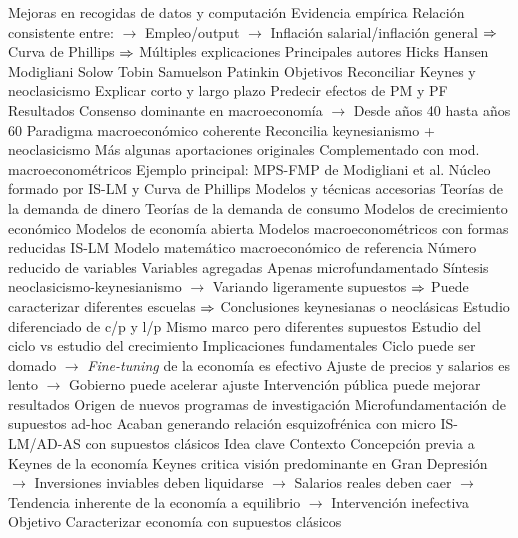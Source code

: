 \documentclass{nuevotema}
\begin{document}
\begin{esquemal}
				\4[] Mejoras en recogidas de datos y computación
				\4 Evidencia empírica
				\4[] Relación consistente entre:
				\4[] $\to$ Empleo/output
				\4[] $\to$ Inflación salarial/inflación general
				\4[] $\Rightarrow$ Curva de Phillips
				\4[] $\Rightarrow$ Múltiples explicaciones
				\4 Principales autores
				\4[] Hicks
				\4[] Hansen
				\4[] Modigliani
				\4[] Solow
				\4[] Tobin
				\4[] Samuelson
				\4[] Patinkin
			\3 Objetivos
				\4 Reconciliar Keynes y neoclasicismo
				\4 Explicar corto y largo plazo
				\4 Predecir efectos de PM y PF
			\3 Resultados
				\4 Consenso dominante en macroeconomía
				\4$\to$  Desde años 40 hasta años 60
				\4 Paradigma macroeconómico coherente
				\4[] Reconcilia keynesianismo + neoclasicismo
				\4[] Más algunas aportaciones originales
				\4[] Complementado con mod. macroeconométricos
				\4[] Ejemplo principal: MPS-FMP de Modigliani et al.
				\4[] Núcleo formado por IS-LM y Curva de Phillips
				\4 Modelos y técnicas accesorias
				\4[] Teorías de la demanda de dinero
				\4[] Teorías de la demanda de consumo
				\4[] Modelos de crecimiento económico
				\4[] Modelos de economía abierta
				\4[] Modelos macroeconométricos con formas reducidas
				\4 IS-LM Modelo matemático macroeconómico de referencia
				\4[] Número reducido de variables
				\4[] Variables agregadas
				\4[] Apenas microfundamentado
				\4[] Síntesis neoclasicismo-keynesianismo
				\4[] $\to$ Variando ligeramente supuestos
				\4[] $\Rightarrow$ Puede caracterizar diferentes escuelas
				\4[] $\Rightarrow$ Conclusiones keynesianas o neoclásicas
				\4 Estudio diferenciado de c/p y l/p
				\4[] Mismo marco pero diferentes supuestos
				\4[] Estudio del ciclo vs estudio del crecimiento
				\4 Implicaciones fundamentales
				\4[] Ciclo puede ser domado
				\4[] $\to$ \textit{Fine-tuning} de la economía es efectivo
				\4[] Ajuste de precios y salarios es lento
				\4[] $\to$ Gobierno puede acelerar ajuste
				\4[] Intervención pública puede mejorar resultados
				\4 Origen de nuevos programas de investigación
				\4[] Microfundamentación de supuestos ad-hoc
				\4[] Acaban generando relación esquizofrénica con micro
		\2 IS-LM/AD-AS con supuestos clásicos
			\3 Idea clave
				\4 Contexto
				\4[] Concepción previa a Keynes de la economía
				\4[] Keynes critica visión predominante en Gran Depresión
				\4[] $\to$ Inversiones inviables deben liquidarse
				\4[] $\to$ Salarios reales deben caer
				\4[] $\to$ Tendencia inherente de la economía a equilibrio
				\4[] $\to$ Intervención inefectiva
				\4 Objetivo
				\4[] Caracterizar economía con supuestos clásicos

\end{esquemal}
\end{document}
